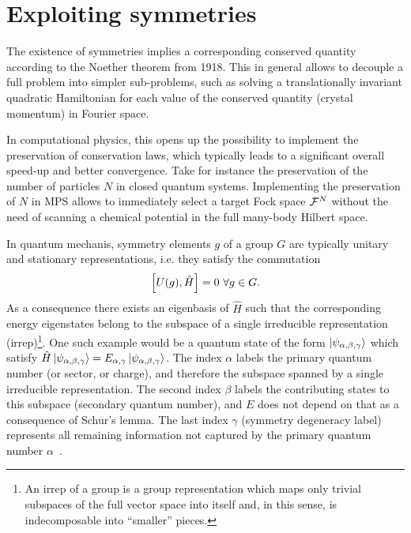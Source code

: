 \section{Exploiting symmetries}
\label{sec:exploiting_symmetries}
%
%
The existence of symmetries implies a corresponding conserved quantity according to the Noether theorem from 1918.
This in general allows to decouple a full problem into simpler sub-problems, such as solving a translationally invariant quadratic Hamiltonian for each value of the conserved quantity (crystal momentum) in Fourier space.

In computational physics, this opens up the possibility to implement the preservation of conservation laws, which typically leads to a significant overall speed-up and better convergence.
Take for instance the preservation of the number of particles $N$ in closed quantum systems.
Implementing the preservation of $N$ in MPS allows to immediately select a target Fock space $\mathcal{F}^N$ without the need of scanning a chemical potential in the full many-body Hilbert space.

In quantum mechanis, symmetry elements $g$ of a group $G$ are typically unitary and stationary representations, i.e. they satisfy the commutation
\begin{align}
    \left[ U(g),\hat H \right] = 0\ \forall g\in G.
\end{align}
As a consequence there exists an eigenbasis of $\hat H$ such that the corresponding energy eigenstates belong to the subspace of a single irreducible representation (irrep)\footnote{An irrep of a group is a group representation which maps only trivial subspaces of the full vector space into itself and, in this sense, is indecomposable into ``smaller'' pieces.}.
One such example would be a quantum state of the form $\ket{\psi_{\alpha,\beta,\gamma}}$ which satisfy $\hat H\ket{\psi_{\alpha,\beta,\gamma}} = E_{\alpha,\gamma}\ket{\psi_{\alpha,\beta,\gamma}}$.
The index $\alpha$ labels the primary quantum number (or sector, or charge), and therefore the subspace spanned by a single irreducible representation.
The second index $\beta$ labels the contributing states to this subspace (secondary quantum number), and $E$ does not depend on that as a consequence of Schur's lemma.
The last index $\gamma$ (symmetry degeneracy label) represents all remaining information not captured by the primary quantum number $\alpha$~\cite{Silvi2019}.

